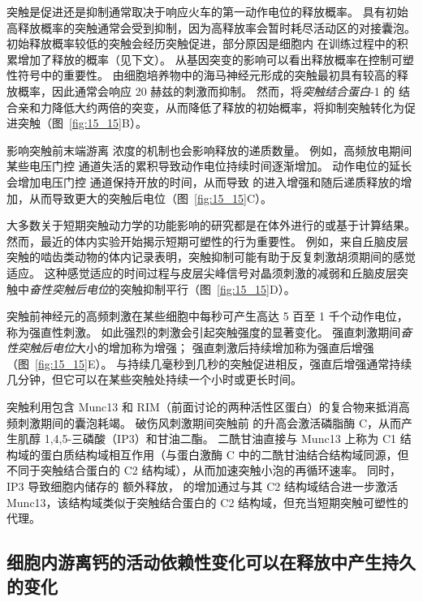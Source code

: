 突触是促进还是抑制通常取决于响应火车的第一动作电位的释放概率。
具有初始高释放概率的突触通常会受到抑制，因为高释放率会暂时耗尽活动区的对接囊泡。
初始释放概率较低的突触会经历突触促进，部分原因是细胞内  在训练过程中的积累增加了释放的概率（见下文）。
从基因突变的影响可以看出释放概率在控制可塑性符号中的重要性。
由细胞培养物中的海马神经元形成的突触最初具有较高的释放概率，因此通常会响应 20 赫兹的刺激而抑制。
然而，将\textit{突触结合蛋白}-1 的  结合亲和力降低大约两倍的突变，从而降低了释放的初始概率，将抑制突触转化为促进突触（图~\ref{fig:15_15}B）。


影响突触前末端游离  浓度的机制也会影响释放的递质数量。
例如，高频放电期间某些电压门控  通道失活的累积导致动作电位持续时间逐渐增加。
动作电位的延长会增加电压门控  通道保持开放的时间，从而导致  的进入增强和随后递质释放的增加，从而导致更大的突触后电位（图~\ref{fig:15_15}C）。


大多数关于短期突触动力学的功能影响的研究都是在体外进行的或基于计算结果。
然而，最近的体内实验开始揭示短期可塑性的行为重要性。
例如，来自丘脑皮层突触的啮齿类动物的体内记录表明，突触抑制可能有助于反复刺激胡须期间的感觉适应。
这种感觉适应的时间过程与皮层尖峰信号对晶须刺激的减弱和丘脑皮层突触中\textit{奋性突触后电位}的突触抑制平行（图~\ref{fig:15_15}D）。


突触前神经元的高频刺激在某些细胞中每秒可产生高达 5 百至 1 千个动作电位，称为强直性刺激。
如此强烈的刺激会引起突触强度的显著变化。
强直刺激期间\textit{奋性突触后电位}大小的增加称为增强；
强直刺激后持续增加称为强直后增强（图~\ref{fig:15_15}E）。
与持续几毫秒到几秒的突触促进相反，强直后增强通常持续几分钟，但它可以在某些突触处持续一个小时或更长时间。


突触利用包含 Munc13 和 RIM（前面讨论的两种活性区蛋白）的复合物来抵消高频刺激期间的囊泡耗竭。
破伤风刺激期间突触前  的升高会激活磷脂酶 C，从而产生肌醇 1,4,5-三磷酸（IP3）和甘油二酯。
二酰甘油直接与 Munc13 上称为 C1 结构域的蛋白质结构域相互作用（与蛋白激酶 C 中的二酰甘油结合结构域同源，但不同于突触结合蛋白的 C2 结构域），从而加速突触小泡的再循环速率。
同时，IP3 导致细胞内储存的  额外释放， 的增加通过与其 C2 结构域结合进一步激活 Munc13，该结构域类似于突触结合蛋白的 C2 结构域，但充当短期突触可塑性的代理。



\subsection{细胞内游离钙的活动依赖性变化可以在释放中产生持久的变化}

